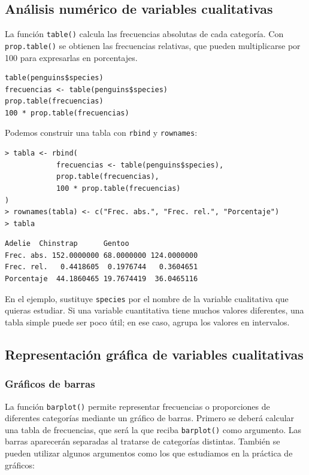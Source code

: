 \documentclass[11pt,a4paper]{article}
\theoremstyle{exercise}
\begin{document}
\subsection{Análisis numérico de variables cualitativas}

La función \texttt{table()} calcula las frecuencias absolutas de cada categoría. Con \texttt{prop.table()} se obtienen las frecuencias relativas, que pueden multiplicarse por 100 para expresarlas en porcentajes.
\begin{lstlisting}[style=rstyle]
table(penguins$species)
frecuencias <- table(penguins$species)
prop.table(frecuencias)
100 * prop.table(frecuencias)
\end{lstlisting}



Podemos construir una tabla con \texttt{rbind} y \texttt{rownames}:

\begin{lstlisting}[style=rconsole]
> tabla <- rbind(
			frecuencias <- table(penguins$species),
			prop.table(frecuencias),
			100 * prop.table(frecuencias)
)			
> rownames(tabla) <- c("Frec. abs.", "Frec. rel.", "Porcentaje")
> tabla
\end{lstlisting}

\begin{lstlisting}[style=routput]
                Adelie  Chinstrap      Gentoo
Frec. abs. 152.0000000 68.0000000 124.0000000
Frec. rel.   0.4418605  0.1976744   0.3604651
Porcentaje  44.1860465 19.7674419  36.0465116
\end{lstlisting}


En el ejemplo, sustituye \texttt{species} por el nombre de la variable cualitativa que quieras estudiar. Si una variable cuantitativa tiene muchos valores diferentes, una tabla simple puede ser poco útil; en ese caso, agrupa los valores en intervalos.

\subsection{Representación gráfica de variables cualitativas}

\subsubsection{Gráficos de barras}

La función \texttt{barplot()} permite representar frecuencias o proporciones de diferentes categorías mediante un gráfico de barras. Primero se deberá calcular una tabla de frecuencias, que será la que reciba \texttt{barplot()} como argumento. Las barras aparecerán separadas al tratarse de categorías distintas. También se pueden utilizar algunos argumentos como los que estudiamos en la práctica de gráficos:
\end{document}
